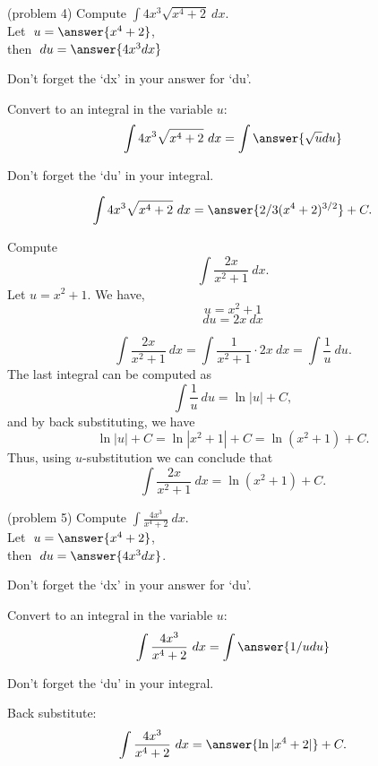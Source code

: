 \documentclass[handout]{ximera}
\begin{document}
\begin{problem}(problem 4) Compute $\displaystyle{\int 4x^3 \sqrt{x^4 +2} \ dx}$.\\
Let $\;u = \answer{x^4 + 2}$,\\
then $\;du = \answer{4x^3 dx}$\\
\begin{hint}
Don't forget the `dx' in your answer for `du'.
\end{hint}
Convert to an integral in the variable $u$:
\[\int 4x^3 \sqrt{x^4 +2} \ dx = \int\answer{\sqrt u du}\]
\begin{hint}
Don't forget the `du' in your integral.
\end{hint}

\[\int 4x^3 \sqrt{x^4 +2} \ dx = \answer{2/3(x^4 +2)^{3/2}} +C.\]
\end{problem}



\begin{example}[example 5] Compute 
\[\int \frac{2x}{x^2 + 1} \ dx.\]
Let $u = x^2 + 1$.  We have,
\[u = x^2 + 1\]
\[du = 2x \ dx\]

\[\int \frac{2x}{x^2 + 1} \ dx = \int \frac{1}{x^2 + 1} \cdot 2x\  dx = \int \frac{1}{u} \ du.\]
The last integral can be computed as 
\[\int \frac{1}{u} \ du = \ln|u| + C,\]
and by back substituting, we have 
\[\ln|u| + C =  \ln|x^2 + 1| + C=\ln(x^2 + 1) + C.\]
Thus, using $u$-substitution we can conclude that
\[\int \frac{2x}{x^2 + 1} \ dx =  \ln(x^2 + 1) + C.\]
\end{example}


\begin{problem} (problem 5) \hspace{0.2 in} Compute $\displaystyle{\int \frac{4x^3}{x^4 +2} \ dx}$.\\
Let $\;u = \answer{x^4 + 2}$,\\ 
then $\;du = \answer{4x^3 dx}$.\\
\begin{hint}
Don't forget the `dx' in your answer for `du'.
\end{hint}
Convert to an integral in the variable $u$:
\[\int \frac{4x^3}{x^4 +2} \ dx = \int\answer{1/u du}\]
\begin{hint}
Don't forget the `du' in your integral.
\end{hint}
Back substitute:
\[\int \frac{4x^3}{x^4 +2} \ dx = \answer{\ln|x^4 +2|} +C.\]
\end{problem}
\end{document}
